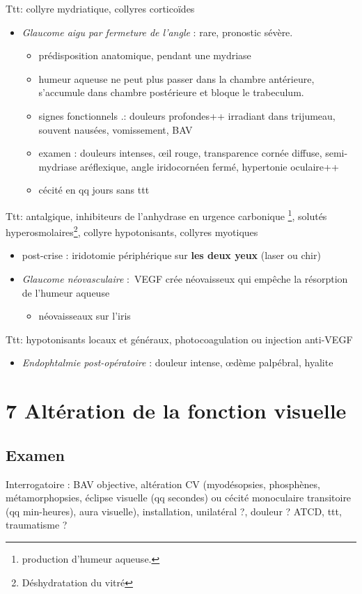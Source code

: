 \documentclass[11pt]{article}
\def\ttt{\hspace*{1cm}Ttt: }
\begin{document}
\ttt collyre mydriatique, collyres corticoïdes
\begin{itemize}
\item \emph{Glaucome aigu par fermeture de l'angle} : rare, pronostic sévère.
\begin{itemize}
\item prédisposition anatomique, pendant une mydriase
\item humeur aqueuse ne peut plus passer dans la chambre antérieure, s'accumule
dans chambre postérieure et bloque le trabeculum.
\item signes fonctionnels .: douleurs profondes++ irradiant dans trijumeau,
souvent nausées, vomissement, BAV
\item examen : douleurs intenses, \oe{}il rouge, transparence cornée \dec diffuse,
semi-mydriase aréflexique, angle iridocornéen fermé, hypertonie oculaire++
\item cécité en qq jours sans ttt \danger
\end{itemize}
\end{itemize}
\ttt antalgique, inhibiteurs de l'anhydrase en urgence \skull
    carbonique \footnote{\dec production d'humeur aqueuse.}, solutés hyperosmolaires\footnote{Déshydratation du vitré}, collyre hypotonisants,
    collyres myotiques
\begin{itemize}
\item post-crise : iridotomie périphérique sur \textbf{les deux yeux} (laser ou chir)
\end{itemize}
\begin{itemize}
\item \emph{Glaucome néovasculaire} : VEGF crée néovaisseux qui empêche la résorption de
l'humeur aqueuse
\begin{itemize}
\item néovaisseaux sur l'iris
\end{itemize}
\end{itemize}
\ttt hypotonisants locaux et généraux, photocoagulation ou injection anti-VEGF
\begin{itemize}
\item \emph{Endophtalmie post-opératoire} : douleur intense, \oe{}dème palpébral, hyalite
\end{itemize}
\section{7 Altération de la fonction visuelle}
\label{sec:org42620c6}
\subsection{Examen}
\label{sec:org5f51518}
Interrogatoire : BAV objective, altération CV  (myodésopsies, phosphènes,
métamorphopsies, éclipse visuelle (qq secondes) ou cécité monoculaire
transitoire (qq min-heures), aura visuelle), installation, unilatéral ?, douleur
? ATCD, ttt, traumatisme ?
\end{document}
